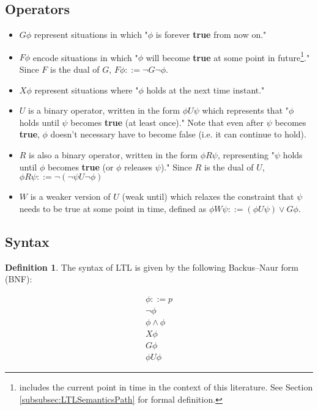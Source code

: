 \documentclass{article}
\theoremstyle{plain}
\theoremstyle{definition}
\newtheorem{defn}[thm]{Definition} %
\begin{document}
\begin{multicols}{2}
\subsection{Operators}

\begin{itemize}
\item $G\phi$ represent situations in which "$\phi$ is forever \textbf{true} from now on."
\item $F\phi$ encode situations in which "$\phi$ will become \textbf{true} at some point in future\footnote{includes the current point in time in the context of this literature. See Section \ref{subsubsec:LTLSemanticsPath} for formal definition.}." Since $F$ is the dual of $G$, $F\phi ::= \lnot G\lnot\phi$.
\item $X\phi$ represent situations where "$\phi$ holds at the next time instant."
\item $U$ is a binary operator, written in the form $\phi U \psi$ which represents that "$\phi$ holds until $\psi$ becomes \textbf{true} (at least once)." Note that even after $\psi$ becomes \textbf{true}, $\phi$ doesn't necessary have to become false (i.e. it can continue to hold).
\item $R$ is also a binary operator, written in the form $\phi R \psi$, representing "$\psi$ holds until $\phi$ becomes \textbf{true} (or $\phi$ releases $\psi$)." Since $R$ is the dual of $U$, $\phi R \psi ::= \lnot(\lnot\psi U\lnot\phi)$
\item $W$ is a weaker version of $U$ (weak until) which relaxes the constraint that $\psi$ needs to be true at some point in time, defined as $\phi W\psi ::= (\phi U \psi)\lor G\phi$.
\end{itemize}

\subsection{Syntax}

\begin{defn}The syntax of LTL is given by the following Backus–Naur form (BNF):\end{defn}

\begin{align*}
\phi ::= p \\
\lnot\phi \\
\phi \land \phi  \\
X\phi \\
G\phi \\
\phi U \phi
\end{align*}



\end{multicols}
\end{document}
